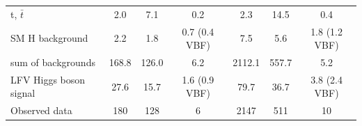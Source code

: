 \documentclass[oneside, letterpaper, oldfontcommands]{memoir}
\begin{document}
\begin{table}[hbtp]
\begin{tabular}{lccc|ccc}
    t, $\bar{t}$                             &  2.0   &  7.1      &  0.2 &2.3 & 14.5 & 0.4    \\
    SM H background                        &  2.2   &  1.8      &  0.7 (0.4 VBF) &7.5 & 5.6 & 1.8 (1.2 VBF)    \\ \hline
    sum of backgrounds                       & 168.8   & 126.0      & 6.2 &2112.1& 557.7 & 5.2  \\  \hline
    LFV Higgs boson signal                   &  27.6   &  15.7      &  1.6 (0.9 VBF) &79.7 & 36.7 & 3.8 (2.4 VBF)   \\ \hline \hline
      Observed data                          &  180   &  128      &  6  & 2147 & 511 & 10 \\ \hline
  \end{tabular}
\end{table}
\end{document}
